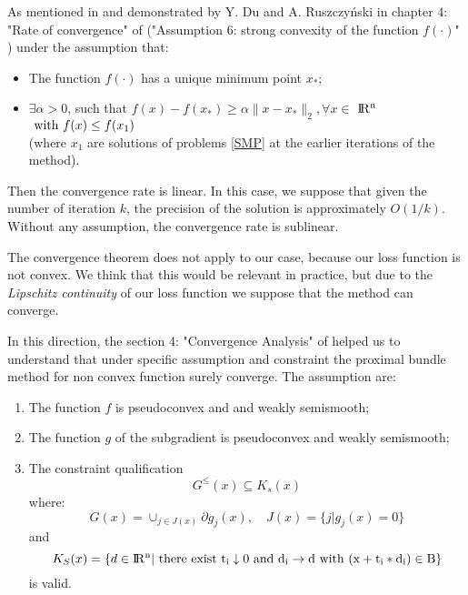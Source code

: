 As mentioned in \cite{PaperBM} and demonstrated by Y. Du and A. Ruszczyński in chapter 4: "Rate of convergence" of \cite{CBM} ("Assumption 6: strong convexity of the function $f(\cdot)$" ) under the assumption that:
\begin{itemize}
	\item The function $f(\cdot)$ has a unique minimum point $x_*$;
	\item $\exists \alpha>0$, such that $f(x)-f(x_*)\geq \alpha \parallel x-x_*\parallel_{2},\forall x \in$ $\rm I\!R^{n}$ $\textnormal{ with } f(x)\leq f(x_1)$ 
	\\ (where $x_1$ are solutions of problems \ref{SMP} at the earlier iterations of the method).
\end{itemize}
  Then the convergence rate is linear. In this case, we suppose that given the number of iteration $k$, the precision of the solution is approximately $O(1/k)$. Without any assumption, the convergence rate is sublinear. 

The convergence theorem does not apply to our case, because our loss function is not convex. We think that this would be relevant in practice, but due to the \textit{Lipschitz continuity} of our loss function we suppose that the method can converge. 

In this direction, the section 4: "Convergence Analysis" of \cite{PBM} helped us to understand that under specific assumption and constraint the proximal bundle method for non convex function surely converge. The assumption are:
\begin{enumerate} \label{convergence:PBM}
	\item The function $f$ is pseudoconvex and and weakly semismooth;
	\item The function $g$ of the subgradient is pseudoconvex and weakly semismooth;
	\item The constraint qualification 
	\begin{equation}
	\label{CQ}
	G^{\leq}(x)\subseteq K_{s}(x)
	\end{equation}
	where:
	\begin{equation}
	\label{G}
	G(x)= \cup_{j\in J(x)} \partial g_{j}(x), \quad J(x)=\{j|g_{j}(x)=0\}
	\end{equation}
	and 
	\begin{equation}
	 K_{S}(x) = \{d \in \rm I\!R^{n} | \textnormal{ there} \textnormal{ exist } t_i \downarrow 0 \textnormal{ and } d_{i} \to d \textnormal{ with } (x + t_i*d_i) \in B\}
	\end{equation}
	 is valid.
\end{enumerate}